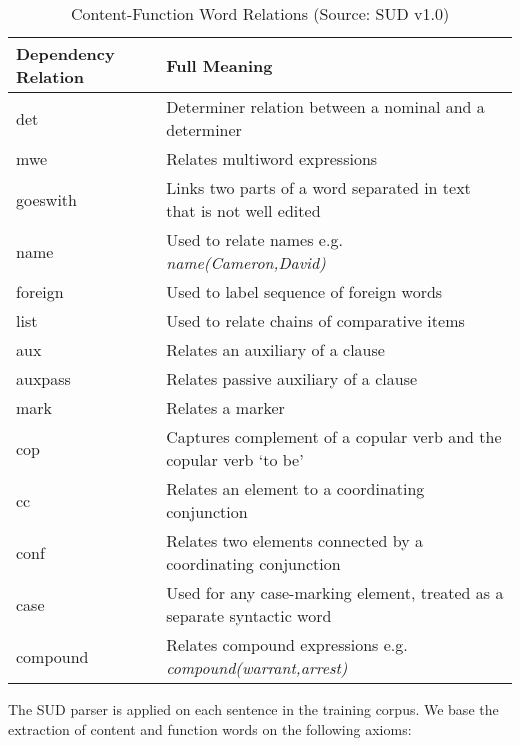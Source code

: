  
\begin{table}%
\caption{Content-Function Word Relations (Source: SUD v1.0)}
\label{tab:seven}
\begin{minipage}{\columnwidth}
\begin{center}
\begin{tabular}{ll} 
\toprule
Dependency Relation &	Full Meaning \\
  \toprule
  
det	& Determiner relation between a nominal and a determiner \\
mwe	& Relates multiword expressions \\
goeswith	& Links two parts of a word separated in text that is not well edited \\
name	& Used to relate names e.g. \textit{name(Cameron,David)} \\
foreign	& Used to label sequence of foreign words \\
list	& Used to relate chains of comparative items \\
aux	& Relates an auxiliary of a clause \\
auxpass	& Relates passive auxiliary of a clause \\
mark	& Relates a marker \\
cop	& Captures complement of a copular verb and the copular verb `to be' \\
cc	& Relates an element to a coordinating conjunction \\
conf	& Relates two elements connected by a coordinating conjunction \\
case	& Used for any case-marking element, treated as a separate syntactic word  \\
compound	& Relates compound expressions e.g. \textit{compound(warrant,arrest)} \\
\bottomrule
\end{tabular}
\end{center}
\bigskip\centering

\end{minipage}
\end{table}%


The SUD parser is applied on each sentence in the training corpus. We base the extraction of content and function words on the following axioms:

